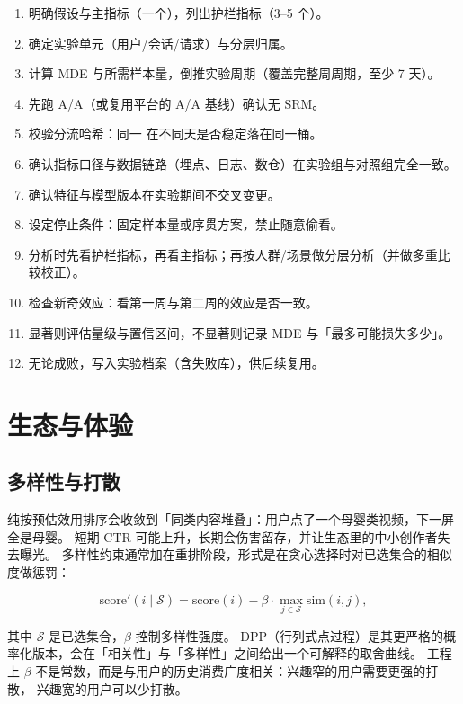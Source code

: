 \begin{toolbox}
\begin{enumerate}
  \item 明确假设与主指标（一个），列出护栏指标（3--5 个）。
  \item 确定实验单元（用户/会话/请求）与分层归属。
  \item 计算 MDE 与所需样本量，倒推实验周期（覆盖完整周周期，至少 7 天）。
  \item 先跑 A/A（或复用平台的 A/A 基线）确认无 SRM。
  \item 校验分流哈希：同一  在不同天是否稳定落在同一桶。
  \item 确认指标口径与数据链路（埋点、日志、数仓）在实验组与对照组完全一致。
  \item 确认特征与模型版本在实验期间不交叉变更。
  \item 设定停止条件：固定样本量或序贯方案，禁止随意偷看。
  \item 分析时先看护栏指标，再看主指标；再按人群/场景做分层分析（并做多重比较校正）。
  \item 检查新奇效应：看第一周与第二周的效应是否一致。
  \item 显著则评估量级与置信区间，不显著则记录 MDE 与「最多可能损失多少」。
  \item 无论成败，写入实验档案（含失败库），供后续复用。
\end{enumerate}
\end{toolbox}

\section{生态与体验}

\subsection{多样性与打散}

纯按预估效用排序会收敛到「同类内容堆叠」：用户点了一个母婴类视频，下一屏全是母婴。
短期 CTR 可能上升，长期会伤害留存，并让生态里的中小创作者失去曝光。
多样性约束通常加在重排阶段，形式是在贪心选择时对已选集合的相似度做惩罚：

\begin{equation}
\text{score}'(i \mid \mathcal{S}) = \text{score}(i) - \beta \cdot \max_{j \in \mathcal{S}} \text{sim}(i, j),
\label{eq:dpp-greedy}
\end{equation}

其中 $\mathcal{S}$ 是已选集合，$\beta$ 控制多样性强度。
DPP（行列式点过程）是其更严格的概率化版本，会在「相关性」与「多样性」之间给出一个可解释的取舍曲线。
工程上 $\beta$ 不是常数，而是与用户的历史消费广度相关：兴趣窄的用户需要更强的打散，
兴趣宽的用户可以少打散。

